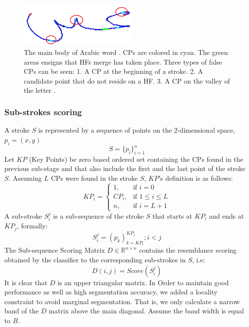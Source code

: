 \documentclass[journal,compsoc]{IEEEtran}
\begin{document}
\begin{figure}
\centering
\includegraphics[width=6cm]{./figures/candidate_in_no_horizontal}
\caption{The main body of Arabic word . CPs are colored in cyan. The green areas ensigns that HFs merge has taken place. Three types of false CPs can be seen: 1. A CP at the beginning of a stroke. 2. A candidate point that do not reside on a HF. 3. A CP on the valley of the letter . }
\label{fig:candidate_in_no_horizontal}
\end{figure}

\subsubsection{Sub-strokes scoring}
A stroke $S$ is represented by a sequence of points on the 2-dimensional space, $p_{i}=(x,y)$ 
\begin{equation}
S=\{p_{i}\}_{i=1}^{n}
\end{equation}
Let $KP$ (Key Points) be zero based ordered set containing the CPs found in the previous sub-stage and that also include the first and the last point of the stroke $S$. Assuming $L$ CPs were found in the stroke $S$, $KP$'s definition is as follows: 
\begin{equation}
KP_{i} =\begin{cases}    1		, & \mbox{if } i=0 \\
							   CP_{i}	, & \mbox{if } 1\leq i \leq L \\
							   n    , & \mbox{if } i=L+1 
			\end{cases}				
\end{equation}
A sub-stroke $S_{i}^{j}$ is a sub-sequence of the stroke $S$ that starts at $KP_{i}$ and ends at $KP_{j}$, formally:
\begin{equation}
S_{i}^{j}=(p_{k})_{k=KP_{i}}^{KP_{j}}; i<j
\end{equation}
The Sub-sequence Scoring Matrix $D\in\mathbb{R}^{n\times n}$ contains the resemblance scoring obtained by the classifier to the corresponding sub-strokes in $S$, i.e:
\begin{equation}
D(i,j)=Score(S_{i}^{j})
\end{equation}
It is clear that $D$ is an upper triangular matrix. In Order to maintain good performance as well as high segmentation accuracy, we added a locality constraint to avoid marginal segmentation. That is, we only calculate a narrow band of the $D$ matrix above the main diagonal. Assume the band width is equal to $B$.
\end{document}
